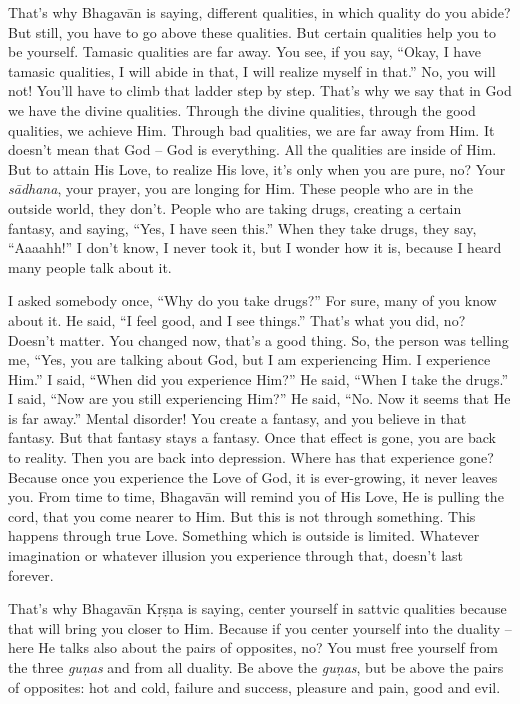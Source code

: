 That’s why Bhagavān is saying, different qualities, in which quality do you abide? But still, you have to go above these qualities. But certain qualities help you to be yourself. Tamasic qualities are far away. You see, if you say, “Okay, I have tamasic qualities, I will abide in that, I will realize myself in that.” No, you will not! You’ll have to climb that ladder step by step. That’s why we say that in God we have the divine qualities. Through the divine qualities, through the good qualities, we achieve Him. Through bad qualities, we are far away from Him. It doesn’t mean that God – God is everything. All the qualities are inside of Him. But to attain His Love, to realize His love, it’s only when you are pure, no? Your \textit{sādhana}, your prayer, you are longing for Him. These people who are in the outside world, they don’t. People who are taking drugs, creating a certain fantasy, and saying, “Yes, I have seen this.” When they take drugs, they say, “Aaaahh!” I don’t know, I never took it, but I wonder how it is, because I heard many people talk about it.

I asked somebody once, “Why do you take drugs?” For sure, many of you know about it. He said, “I feel good, and I see things.” That’s what you did, no? Doesn’t matter. You changed now, that’s a good thing. So, the person was telling me, “Yes, you are talking about God, but I am experiencing Him. I experience Him.” I said, “When did you experience Him?” He said, “When I take the drugs.” I said, “Now are you still experiencing Him?” He said, “No. Now it seems that He is far away.” Mental disorder! You create a fantasy, and you believe in that fantasy. But that fantasy stays a fantasy. Once that effect is gone, you are back to reality. Then you are back into depression. Where has that experience gone? Because once you experience the Love of God, it is ever-growing, it never leaves you. From time to time, Bhagavān will remind you of His Love, He is pulling the cord, that you come nearer to Him. But this is not through something. This happens through true Love. Something which is outside is limited. Whatever imagination or whatever illusion you experience through that, doesn’t last forever.

That’s why Bhagavān Kṛṣṇa is saying, center yourself in sattvic qualities because that will bring you closer to Him. Because if you center yourself into the duality – here He talks also about the pairs of opposites, no? You must free yourself from the three \textit{guṇas} and from all duality. Be above the \textit{guṇas}, but be above the pairs of opposites: hot and cold, failure and success, pleasure and pain, good and evil.

